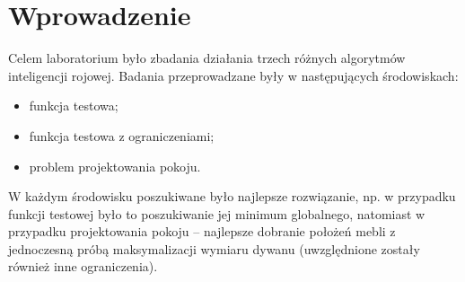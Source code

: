 \section{Wprowadzenie}

Celem laboratorium było zbadania działania trzech różnych algorytmów inteligencji rojowej. Badania przeprowadzane były w następujących środowiskach:

\begin{itemize}
	\item funkcja testowa;
	\item funkcja testowa z ograniczeniami;
	\item problem projektowania pokoju.
\end{itemize}

W każdym środowisku poszukiwane było najlepsze rozwiązanie, np. w przypadku funkcji testowej było to poszukiwanie jej minimum globalnego, natomiast w przypadku projektowania pokoju -- najlepsze dobranie położeń mebli z jednoczesną próbą maksymalizacji wymiaru dywanu (uwzględnione zostały również inne ograniczenia).